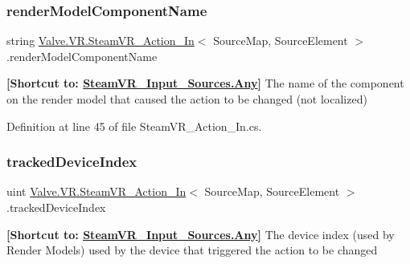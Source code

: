 \subsubsection{\texorpdfstring{renderModelComponentName}{renderModelComponentName}}
{\footnotesize\ttfamily string \mbox{\hyperlink{class_valve_1_1_v_r_1_1_steam_v_r___action___in}{Valve.\+V\+R.\+Steam\+V\+R\+\_\+\+Action\+\_\+\+In}}$<$ Source\+Map, Source\+Element $>$.render\+Model\+Component\+Name\hspace{0.3cm}{\ttfamily [get]}}



{\bfseries{\mbox{[}Shortcut to\+: \mbox{\hyperlink{namespace_valve_1_1_v_r_a82e5bf501cc3aa155444ee3f0662853faed36a1ef76a59ee3f15180e0441188ad}{Steam\+V\+R\+\_\+\+Input\+\_\+\+Sources.\+Any}}\mbox{]}}} The name of the component on the render model that caused the action to be changed (not localized) 



Definition at line 45 of file Steam\+V\+R\+\_\+\+Action\+\_\+\+In.\+cs.

\mbox{\label{class_valve_1_1_v_r_1_1_steam_v_r___action___in_afd572897e423daf987b7708a6d8dc890}} 
\subsubsection{\texorpdfstring{trackedDeviceIndex}{trackedDeviceIndex}}
{\footnotesize\ttfamily uint \mbox{\hyperlink{class_valve_1_1_v_r_1_1_steam_v_r___action___in}{Valve.\+V\+R.\+Steam\+V\+R\+\_\+\+Action\+\_\+\+In}}$<$ Source\+Map, Source\+Element $>$.tracked\+Device\+Index\hspace{0.3cm}{\ttfamily [get]}}



{\bfseries{\mbox{[}Shortcut to\+: \mbox{\hyperlink{namespace_valve_1_1_v_r_a82e5bf501cc3aa155444ee3f0662853faed36a1ef76a59ee3f15180e0441188ad}{Steam\+V\+R\+\_\+\+Input\+\_\+\+Sources.\+Any}}\mbox{]}}} The device index (used by Render Models) used by the device that triggered the action to be changed 



